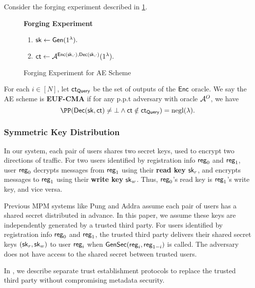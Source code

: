 \begin{definition}
\label{defn:AE-unforgability}
Consider the forging experiment described in \cref{expr:AE-forging}.

\begin{figure}[ht!]
\begin{framed}
\textbf{Forging Experiment}
\begin{enumerate}
    \item ${\mathsf{sk}} \leftarrow \mathsf{Gen}(1^{\lambda}).$
    \item $\mathsf{ct} \leftarrow \mathcal{A}^{\mathsf{Enc}({\mathsf{sk}}, \cdot), \mathsf{Dec}({\mathsf{sk}}, \cdot)}(1^{\lambda}).$
\end{enumerate}
\end{framed}
\caption{Forging Experiment for AE Scheme}
\label{expr:AE-forging}
\end{figure}

For each $i \in [N]$, let $\mathsf{ct}_{\mathsf{Query}}$ be the set of outputs of the $\mathsf{Enc}$ oracle. We say the AE scheme is \textbf{EUF-CMA} if for any p.p.t adversary with oracle $\mathcal{A}^O$, we have
$$\PP(\dec(\sk, \ct) \neq \bot \land \ct \notin \ct_{\query}) = \negl(\lambda).$$
\end{definition}

\subsubsection{Symmetric Key Distribution}
In our system, each pair of users shares two secret keys, used to encrypt two directions of traffic. For two users identified by registration info $\mathsf{reg}_0$ and $\mathsf{reg}_1$, user $\mathsf{reg}_0$ decrypts messages from $\mathsf{reg}_1$ using their \textbf{read key} ${\mathsf{sk}}_r$, and encrypts messages to $\mathsf{reg}_1$ using their \textbf{write key} ${\mathsf{sk}}_w$. Thus, $\mathsf{reg}_0$'s read key is $\mathsf{reg}_1$'s write key, and vice versa.

Previous MPM systems like Pung and Addra assume each pair of users has a shared secret distributed in advance.  In this paper, we assume these keys are independently generated by a trusted third party.  For users identified by registration info $\mathsf{reg}_0$ and $\mathsf{reg}_1$, the trusted third party delivers their shared secret keys $({\mathsf{sk}}_r, {\mathsf{sk}}_w)$ to user $\mathsf{reg}_i$ when $\mathsf{GenSec}(\mathsf{reg}_i, \mathsf{reg}_{1 - i})$ is called. The adversary does not have access to the shared secret between trusted users.

In \cite[Section 4]{whitepaper}, we describe separate trust establishment protocols to replace the trusted third party without compromising metadata security. 

